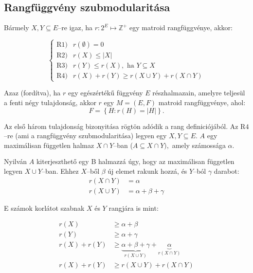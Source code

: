 \subsection{Rangfüggvény szubmodularitása}
Bármely $X, Y \subseteq E$--re igaz, ha $r:2^E \mapsto \mathbb{Z}^+$ egy matroid
rangfüggvénye, akkor:

\[
	\begin{cases}
		\mbox{R1)} & r(\emptyset) = 0                           \\
		\mbox{R2)} & r(X) \leq |X|                              \\
		\mbox{R3)} & r(Y) \leq r(X), \mbox{ ha } Y \subseteq X  \\
		\mbox{R4)} & r(X)+ r(Y) \geq r(X \cup Y) + r (X \cap Y)
	\end{cases}
\]

Azaz (fordítva), ha $r$ egy egészértékű függvény $E$ részhalmazain, amelyre
teljesül a fenti négy tulajdonság, akkor $r$ egy $M=(E,F)$ matroid rangfüggvénye,
ahol:
\[F=\left\{ H : r(H)=|H| \right\}. \]

Az első három tulajdonság bizonyitása rögtön adódik a rang definiciójából. Az
R$4$--re (ami a rangfüggvény szubmodularitása) legyen egy $X,Y \subseteq E$. $A$
egy maximálisan független halmaz $X \cap Y$--ban ($A \subseteq X \cap Y),$ amely
számossága $\alpha$.

Nyilván $A$ kiterjeszthető egy B halmazzá úgy, hogy az maximálisan független
legyen $X \cup Y$--ban. Ehhez $X$--ből $\beta$ új elemet rakunk hozzá, és
$Y$--ból $\gamma$ darabot:
\begin{align*}
	r(X \cap Y) & = \alpha                  \\
	r(X \cup Y) & = \alpha + \beta + \gamma
\end{align*}

E számok korlátot szabnak $X$ és $Y$ rangjára is mint:

\begin{align*}
	r(X)        & \geq \alpha + \beta                                                                         \\
	r(Y)        & \geq \alpha + \gamma                                                                        \\
	r(X) + r(Y) & \geq \underbrace{\alpha + \beta + \gamma}_{r(X \cup Y)} + \underbrace{\alpha}_{r(X \cap Y)} \\
	r(X) + r(Y) & \geq r(X \cup Y) + r(X \cap Y)                                                              \\
\end{align*}

